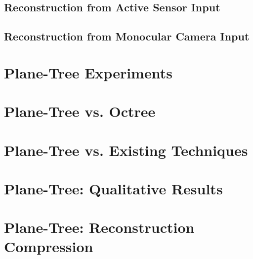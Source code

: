 \subsection{Reconstruction from Active Sensor Input}
\label{ActiveSOTA}


\subsection{Reconstruction from Monocular Camera Input}
\label{Sec:MonocularSOTA}




\section{Plane-Tree Experiments}

\section{Plane-Tree vs. Octree}
\label{SEC:PTVSOT}

\section{Plane-Tree vs. Existing Techniques}
\label{SEC:PTVSSOTA}

\section{Plane-Tree: Qualitative Results}
\label{SEC:PTQUALEVAL}

\section{Plane-Tree: Reconstruction Compression}
\label{SEC:PTONRECON}




